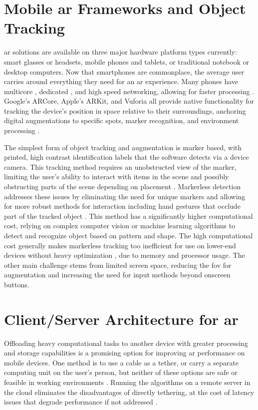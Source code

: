 \documentclass[thesis]{fputhesis}
\begin{document}
\begin{body}
\section{Mobile \acrshort{ar} Frameworks and Object Tracking}
\acrfull{ar} solutions are available on three major hardware platform types currently: smart glasses or headsets, mobile phones and tablets, or traditional notebook or desktop computers. Now that smartphones are commonplace, the average user carries around everything they need for an \acrshort{ar} experience. Many phones have multicore , dedicated , and high speed networking, allowing for faster processing \cite{chatzopoulos_mobile_2017}. Google's ARCore, Apple's ARKit, and Vuforia all provide native functionality for tracking the device's position in space relative to their surroundings, anchoring digital augmentations to specific spots, marker recognition, and environment processing \cite{oufqir_arkit_2020}.

The simplest form of object tracking and augmentation is marker based, with printed, high contrast identification labels that the software detects via a device camera. This tracking 
method requires an unobstructed view of the marker, limiting the user's ability to interact with items in the scene and possibly obstructing parts of the scene depending on placement \cite{platonov_mobile_2006}. Markerless detection addresses these issues by eliminating the need for unique markers and allowing for more robust methods for interaction including hand gestures that occlude part of the tracked object \cite{bai_poster_2013}. 
This method has a significantly higher computational cost, relying on complex computer vision or machine learning algorithms to detect and recognize object based on pattern and shape. The high computational cost generally makes markerless tracking too inefficient for use on lower-end devices without heavy optimization \cite{nazri_current_2014}, due to memory and processor usage. The other main challenge stems from limited screen space, reducing the \acrfull{fov} for augmentation and increasing the need for input methods beyond onscreen buttons.

\section{Client/Server Architecture for \acrshort{ar}}
Offloading heavy computational tasks to another device with greater processing and storage capabilities is a promising option for improving \acrshort{ar} performance on mobile devices. One method is to use a cable as a tether, or carry a separate computing unit on the user's person, but neither of these options are safe or feasible in working 
environments \cite{platonov_mobile_2006}. Running the algorithms on a remote server in the cloud eliminates the disadvantages of directly tethering, at the cost of latency issues that degrade performance if not addressed \cite{zhang_networking_2017}.


\end{body}
\end{document}
